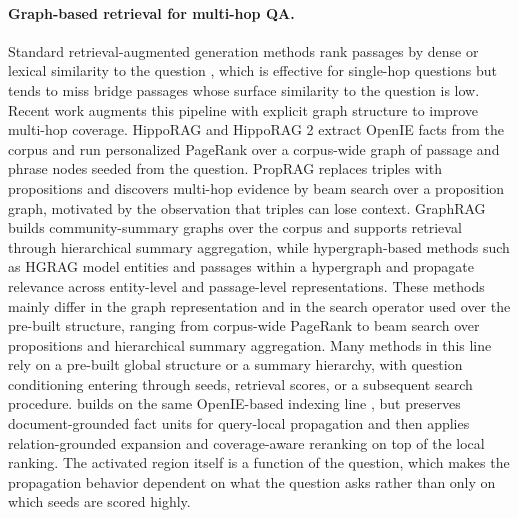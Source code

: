 \paragraph{Graph-based retrieval for multi-hop QA.}
Standard retrieval-augmented generation methods rank passages by dense
or lexical similarity to the question
\citep{karpukhin2020dpr,robertson2009bm25}, which is effective for
single-hop questions but tends to miss bridge passages whose surface
similarity to the question is low. Recent work augments this pipeline
with explicit graph structure to improve multi-hop coverage.
HippoRAG \citep{jimenez2024hipporag} and HippoRAG 2
\citep{gutierrez2025hipporag} extract OpenIE facts from the corpus and
run personalized PageRank over a corpus-wide graph of passage and
phrase nodes seeded from the question. PropRAG \citep{wang2025proprag}
replaces triples with propositions and discovers multi-hop evidence by
beam search over a proposition graph, motivated by the observation that
triples can lose context. GraphRAG \citep{edge2024graphrag} builds
community-summary graphs over the corpus and supports retrieval through
hierarchical summary aggregation, while hypergraph-based methods such
as HGRAG \citep{hgrag2024} model entities and passages within a
hypergraph and propagate relevance across entity-level and
passage-level representations. These methods mainly differ in the graph
representation and in the search operator used over the pre-built
structure, ranging from corpus-wide PageRank to beam search over
	propositions and hierarchical summary aggregation. Many methods in this
	line rely on a pre-built global structure or a summary hierarchy, with
	question conditioning entering through seeds, retrieval scores, or a
	subsequent search procedure. \methodname{} builds on the same
	OpenIE-based indexing line
\citep{angeli2015leveraging,gutierrez2025hipporag}, but preserves
document-grounded fact units for query-local propagation and then
applies relation-grounded expansion and coverage-aware reranking on top
of the local ranking. The activated region itself is a function of the
question, which makes the propagation behavior dependent on what the
question asks rather than only on which seeds are scored highly.

